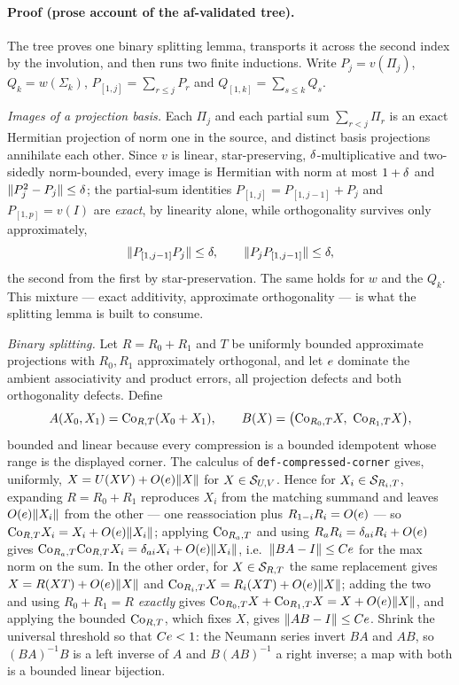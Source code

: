 \paragraph{Proof (prose account of the af-validated tree).}
The tree proves one binary splitting lemma, transports it across the second index by the
involution, and then runs two finite inductions. Write $P_j=v(\Pi_j)$, $Q_k=w(\Sigma_k)$,
$P_{[1,j]}=\sum_{r\le j}P_r$ and $Q_{[1,k]}=\sum_{s\le k}Q_s$.

\emph{Images of a projection basis.} Each $\Pi_j$ and each partial sum
$\sum_{r<j}\Pi_r$ is an exact Hermitian projection of norm one in the source, and
distinct basis projections annihilate each other. Since $v$ is linear, star-preserving,
$\delta$-multiplicative and two-sidedly norm-bounded, every image is Hermitian with norm
at most $1+\delta$ and $\lVert P_j^{2}-P_j\rVert\le\delta$; the partial-sum identities
$P_{[1,j]}=P_{[1,j-1]}+P_j$ and $P_{[1,p]}=v(I)$ are \emph{exact}, by linearity alone,
while orthogonality survives only approximately,
\begin{equation}\label{eq:add-orth}
  \lVert P_{[1,j-1]}P_j\rVert\le\delta,\qquad \lVert P_jP_{[1,j-1]}\rVert\le\delta ,
\end{equation}
the second from the first by star-preservation. The same holds for $w$ and the $Q_k$.
This mixture --- exact additivity, approximate orthogonality --- is what the splitting
lemma is built to consume.

\emph{Binary splitting.} Let $R=R_0+R_1$ and $T$ be uniformly bounded approximate
projections with $R_0,R_1$ approximately orthogonal, and let $e$ dominate the ambient
associativity and product errors, all projection defects and both orthogonality defects.
Define
\[
  A(X_0,X_1)=\mathrm{Co}_{R,T}(X_0+X_1),\qquad
  B(X)=\bigl(\mathrm{Co}_{R_0,T}X,\ \mathrm{Co}_{R_1,T}X\bigr),
\]
bounded and linear because every compression is a bounded idempotent whose range is the
displayed corner. The calculus of \texttt{def-compressed-corner} gives, uniformly,
$X=U(XV)+O(e)\lVert X\rVert$ for $X\in\mathcal S_{U,V}$. Hence for $X_i\in\mathcal S_{R_i,T}$, expanding
$R=R_0+R_1$ reproduces $X_i$ from the matching summand and leaves
$O(e)\lVert X_i\rVert$ from the other --- one reassociation plus $R_{1-i}R_i=O(e)$ ---
so $\mathrm{Co}_{R,T}X_i=X_i+O(e)\lVert X_i\rVert$; applying $\mathrm{Co}_{R_a,T}$ and using
$R_aR_i=\delta_{ai}R_i+O(e)$ gives $\mathrm{Co}_{R_a,T}\mathrm{Co}_{R,T}X_i=\delta_{ai}X_i+O(e)\lVert X_i\rVert$,
i.e.\ $\lVert BA-I\rVert\le Ce$ for the max norm on the sum. In the other order, for
$X\in\mathcal S_{R,T}$ the same replacement gives $X=R(XT)+O(e)\lVert X\rVert$ and
$\mathrm{Co}_{R_i,T}X=R_i(XT)+O(e)\lVert X\rVert$; adding the two and using $R_0+R_1=R$
\emph{exactly} gives $\mathrm{Co}_{R_0,T}X+\mathrm{Co}_{R_1,T}X=X+O(e)\lVert X\rVert$, and applying the
bounded $\mathrm{Co}_{R,T}$, which fixes $X$, gives $\lVert AB-I\rVert\le Ce$. Shrink the universal
threshold so that $Ce<1$: the Neumann series invert $BA$ and $AB$, so $(BA)^{-1}B$ is
a left inverse of $A$ and $B(AB)^{-1}$ a right inverse; a map with both is a bounded
linear bijection.


